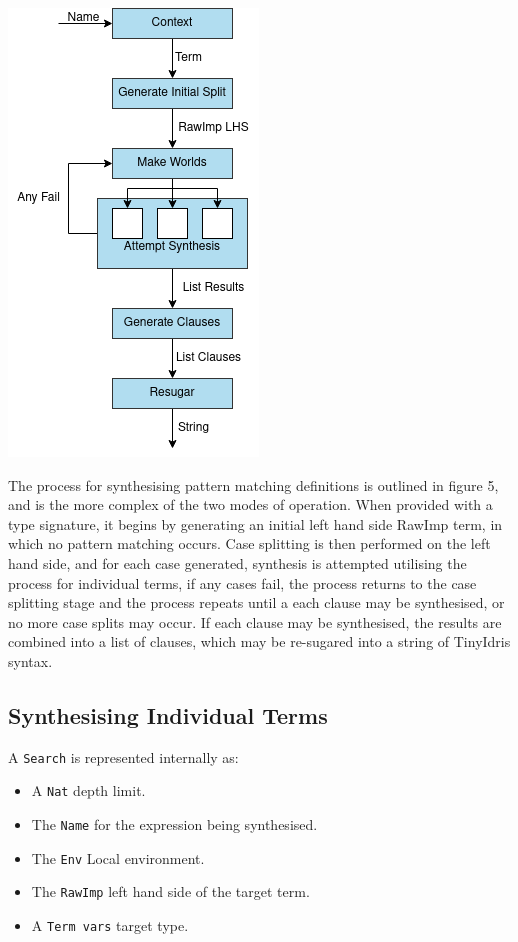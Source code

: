 \documentclass[a4paper]{article}
\newenvironment{Figure}
  {\par\medskip\noindent\minipage{\linewidth}}
  {\endminipage\par\medskip}
\begin{document}
\begin{multicols}{2}
\begin{Figure}
\centering
\includegraphics[scale=0.6]{./Resource/worlds.png}
\end{Figure}
\end{multicols}

The process for synthesising pattern matching definitions is outlined in figure 5,
and is the more complex of the two modes of operation. When provided with
a type signature, it begins by generating an initial left hand side
RawImp term, in which no pattern matching occurs. Case splitting is
then performed on the left hand side, and for each case
generated, synthesis is attempted utilising the process for individual
terms, if any cases fail, the process returns to the case splitting stage and
the process repeats until a each clause may be synthesised, or no more case splits may occur.
If each clause may be synthesised, the results are combined into a list of clauses, which may be re-sugared into a
string of TinyIdris syntax. 


\subsection{Synthesising Individual Terms}
\label{sec:orgc850bb8}

A \texttt{Search} is represented internally as: 
\begin{itemize}
\item A \texttt{Nat} depth limit.
\item The \texttt{Name} for the expression being synthesised.
\item The \texttt{Env} Local environment.
\item The \texttt{RawImp} left hand side of the target term.
\item A \texttt{Term vars} target type.
\end{itemize}
\end{document}
